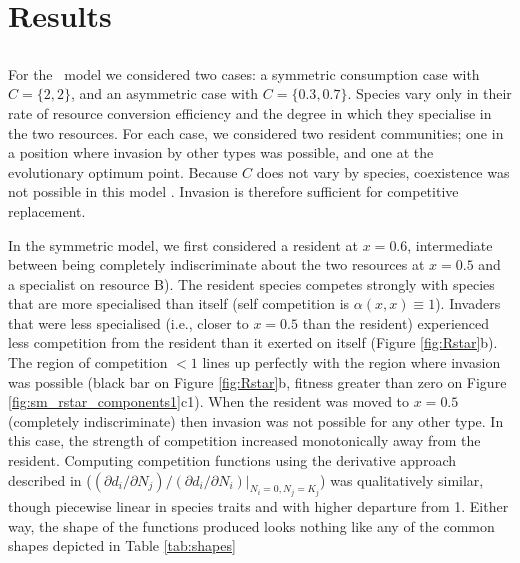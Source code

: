 \documentclass[a4paper,11pt]{article}
\begin{document}
\section{Results}

%

\subsection{\Rstar}



For the \Rstar\ model we considered two cases: a symmetric consumption case with $C = \{2, 2\}$, and an asymmetric case with $C = \{0.3, 0.7\}$.  Species vary only in their rate of resource conversion efficiency and the degree in which they specialise in the two resources.  For each case, we considered two resident communities;
one in a position where invasion by other types was possible, and one at the evolutionary optimum point.
%
Because $C$ does not vary by species, coexistence was not possible in this model \citep{Tilman-1982}. Invasion is therefore sufficient for competitive replacement.

In the symmetric model, we first considered a resident at $x = 0.6$,
intermediate between being completely indiscriminate about the two resources at $x = 0.5$ and a specialist on resource B).
The resident species competes strongly with species that are more specialised than itself (self competition is $\alpha(x, x) \equiv
1$). Invaders that were less specialised (i.e., closer to $x =
0.5$ than the resident) experienced less competition from the resident than it exerted on itself (Figure \ref{fig:Rstar}b).
%
The region of competition $< 1$ lines up perfectly with the region where invasion was possible (black bar on Figure \ref{fig:Rstar}b,
fitness greater than zero on Figure \ref{fig:sm_rstar_components1}c1).
%
When the resident was moved to $x = 0.5$ (completely indiscriminate) then invasion was not possible for any other type.  In this case, the strength of competition increased monotonically away from the resident.
%
Computing competition functions using the derivative approach described in \citet{Abrams-2008}
($(\partial d_i / \partial N_j) / (\partial d_i / \partial N_i) |_{N_i
  = 0, N_j = K_j}$)
was qualitatively similar, though piecewise linear in species traits and with higher departure from 1.
Either way, the shape of the functions produced looks nothing like any of the common shapes depicted in Table \ref{tab:shapes}
\end{document}
